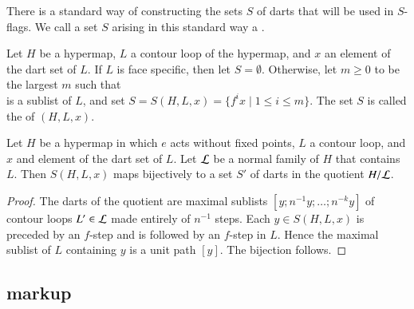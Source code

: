 There is a standard way of constructing the sets $S$ of darts that
will be used in $S$-flags.  We call a set $S$ arising in this
standard way a .

\begin{definition}
Let $H$ be a hypermap, $L$ a contour loop of the hypermap,
and $x$ an element of the dart set of $L$.
If  $L$ is  face specific, then let $S=\emptyset$.
Otherwise,
let $m\ge0$ to be the largest $m$ 
such that 
\begin{displaymath}
[x;f x; f^2 x;\ldots;f^{m+1} x]
\end{displaymath}  
is a sublist of $L$, and
set $S = S(H,L,x) = \{f^i x \mid 1 \le i\le m\}$.
The set $S$ is called the  of $(H,L,x)$.
\end{definition}

\begin{lemma}\label{lemma:flag-set-quotient}
Let $H$ be a hypermap in which $e$ acts without fixed points, 
$L$ a contour loop, and $x$ and element of the dart set of $L$.
Let ${\cal L}$ be a normal family of $H$ that contains $L$.
Then $S(H,L,x)$ maps bijectively to a set $S'$ of darts in the quotient $H/{\cal L}$.
\end{lemma}

\begin{proof} The darts of the quotient are maximal sublists $[y;n^{-1} y;\ldots;n^{-k} y]$
of contour loops $L'\in {\cal L}$ made entirely of $n^{-1}$ steps.  
Each $y\in S(H,L,x)$ is preceded by an $f$-step and is
followed by an $f$-step in $L$.  Hence the maximal sublist of $L$ containing $y$ 
is a unit path $[y]$.  The
bijection follows.
\end{proof}


\subsection{markup}\label{sec:face-insert}
%




